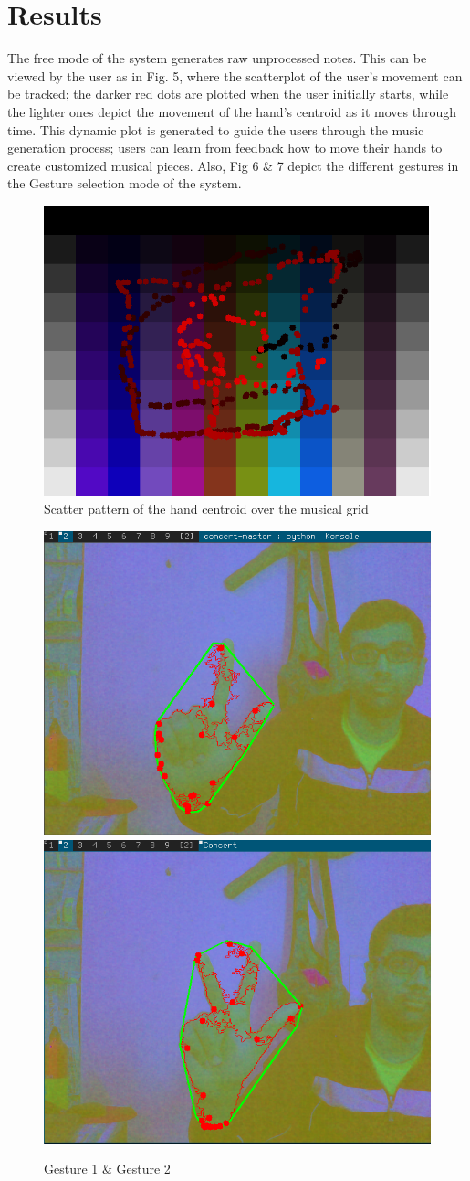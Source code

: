 \documentclass[letterpaper, 10 pt, twoside, conference]{ieeeconf}
\begin{document}
\section{Results}

The free mode of the system generates raw unprocessed notes. This can be viewed by the user as in Fig. 5,
where the scatterplot of the user's movement can be tracked; the darker red dots are plotted when the
user initially starts, while the lighter ones depict the movement of the hand's centroid as it moves
through time. This dynamic plot is generated to guide the users through the music generation process;
users can learn from feedback how to move their hands to create customized musical pieces. Also, Fig 
6 \& 7 depict the different gestures in the Gesture selection mode of the system.

\begin{figure}[h!]
  \centering
  \includegraphics[width=0.8\columnwidth]{scatter.png}
  \caption{Scatter pattern of the hand centroid over the musical grid}
  \label{scatter}
\end{figure}

\begin{figure}[h!]
  \centering
  \includegraphics[width=0.4\columnwidth]{ges1.png}
  \includegraphics[width=0.4\columnwidth]{ges2.png}
  \caption{Gesture 1 \& Gesture 2}
  \label{Overall1}
\end{figure}
\end{document}

